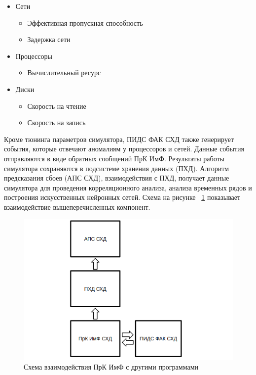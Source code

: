 \begin{itemize}
	\item Сети
	\begin{itemize}
		\item Эффективная пропускная способность 
		\item Задержка сети
	\end{itemize}
	\item Процессоры
	\begin{itemize}
		\item Вычислительный ресурс
	\end{itemize} 
	\item Диски
	\begin{itemize}
		\item Скорость на чтение
		\item Скорость на запись
	\end{itemize} 

\end{itemize}


Кроме тюнинга параметров симулятора, ПИДС ФАК СХД также генерирует события, которые отвечают аномалиям у процессоров и сетей. Данные события отправляются в виде обратных сообщений ПрК ИмФ. Результаты работы симулятора сохраняются в подсистеме хранения данных (ПХД). Алгоритм предсказания сбоев (АПС СХД), взаимодействия с ПХД, получает данные симулятора для проведения корреляционного анализа, анализа временных рядов и построения искусственных нейронных сетей. Схема на рисунке ~\ref{fig:interaction} показывает взаимодействие вышеперечисленных компонент.

\begin{figure}[t!]
	\centering
	\includegraphics[width=\textwidth]{Kenenbek/inter.png}
	\caption{Схема взаимодействия ПрК ИмФ с другими программами}
	\label{fig:interaction}
\end{figure}


